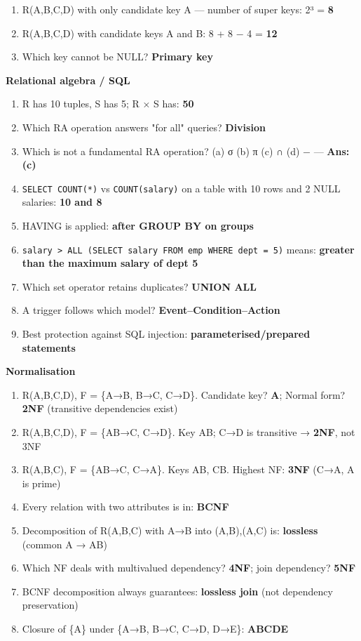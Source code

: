 \begin{enumerate}
\def\labelenumi{\arabic{enumi}.}
\setcounter{enumi}{7}
\tightlist
\item
  R(A,B,C,D) with only candidate key A --- number of super keys: 2³ = \textbf{8}
\item
  R(A,B,C,D) with candidate keys A and B: 8 + 8 − 4 = \textbf{12}
\item
  Which key cannot be NULL? \textbf{Primary key}
\end{enumerate}

\textbf{Relational algebra / SQL}

\begin{enumerate}
\def\labelenumi{\arabic{enumi}.}
\setcounter{enumi}{10}
\tightlist
\item
  R has 10 tuples, S has 5; R × S has: \textbf{50}
\item
  Which RA operation answers "for all" queries? \textbf{Division}
\item
  Which is not a fundamental RA operation? (a) σ (b) π (c) ∩ (d) − --- \textbf{Ans: (c)}
\item
  \texttt{SELECT\ COUNT(*)} vs \texttt{COUNT(salary)} on a table with 10 rows and 2 NULL salaries: \textbf{10 and 8}
\item
  HAVING is applied: \textbf{after GROUP BY on groups}
\item
  \texttt{salary\ \textgreater{}\ ALL\ (SELECT\ salary\ FROM\ emp\ WHERE\ dept\ =\ 5)} means: \textbf{greater than the maximum salary of dept 5}
\item
  Which set operator retains duplicates? \textbf{UNION ALL}
\item
  A trigger follows which model? \textbf{Event--Condition--Action}
\item
  Best protection against SQL injection: \textbf{parameterised/prepared statements}
\end{enumerate}

\textbf{Normalisation}

\begin{enumerate}
\def\labelenumi{\arabic{enumi}.}
\setcounter{enumi}{19}
\tightlist
\item
  R(A,B,C,D), F = \{A→B, B→C, C→D\}. Candidate key? \textbf{A}; Normal form? \textbf{2NF} (transitive dependencies exist)
\item
  R(A,B,C,D), F = \{AB→C, C→D\}. Key AB; C→D is transitive → \textbf{2NF}, not 3NF
\item
  R(A,B,C), F = \{AB→C, C→A\}. Keys AB, CB. Highest NF: \textbf{3NF} (C→A, A is prime)
\item
  Every relation with two attributes is in: \textbf{BCNF}
\item
  Decomposition of R(A,B,C) with A→B into (A,B),(A,C) is: \textbf{lossless} (common A → AB)
\item
  Which NF deals with multivalued dependency? \textbf{4NF}; join dependency? \textbf{5NF}
\item
  BCNF decomposition always guarantees: \textbf{lossless join} (not dependency preservation)
\item
  Closure of \{A\} under \{A→B, B→C, C→D, D→E\}: \textbf{ABCDE}
\end{enumerate}


